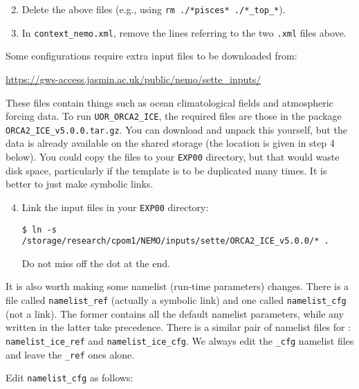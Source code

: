 \begin{enumerate}\setcounter{enumi}{1}
    \item Delete the above files (e.g., using \verb|rm ./*pisces* ./*_top_*|).
    \item In \verb|context_nemo.xml|, remove the lines referring to the two \verb|.xml| files above.
\end{enumerate}

Some \NEMOSIcu{} configurations require extra input files to be downloaded from:

\begin{center}
    \url{https://gws-access.jasmin.ac.uk/public/nemo/sette\_inputs/}
\end{center}

These files contain things such as ocean climatological fields and atmospheric forcing data.
To run \verb|UOR_ORCA2_ICE|, the required files are those in the package \verb|ORCA2_ICE_v5.0.0.tar.gz|.
You can download and unpack this yourself, but the data is already available on the shared storage (the location is given in step 4 below).
You could copy the files to your \verb|EXP00| directory, but that would waste disk space, particularly if the template is to be duplicated many times.
It is better to just make symbolic links.

\begin{enumerate}\setcounter{enumi}{3}
    \item Link the input files in your \verb|EXP00| directory:

\begingroup\small
\begin{verbatim}
$ ln -s /storage/research/cpom1/NEMO/inputs/sette/ORCA2_ICE_v5.0.0/* .
\end{verbatim}
\endgroup

    Do not miss off the dot at the end.

\end{enumerate}

It is also worth making some namelist (run-time parameters) changes.
There is a file called \verb|namelist_ref| (actually a symbolic link) and one called \verb|namelist_cfg| (not a link).
The former contains all the default namelist parameters, while any written in the latter take precedence.
There is a similar pair of namelist files for \SIcu{}: \verb|namelist_ice_ref| and \verb|namelist_ice_cfg|.
We always edit the \verb|_cfg| namelist files and leave the \verb|_ref| ones alone.

Edit \verb|namelist_cfg| as follows:

